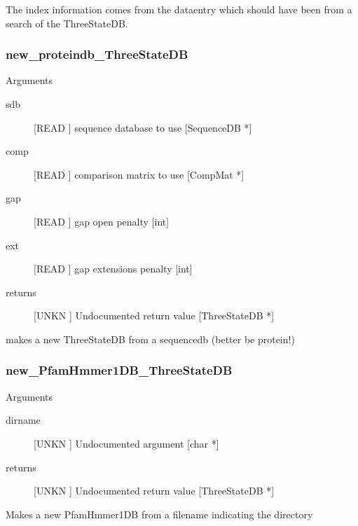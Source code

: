 The index information comes from the dataentry which should 
have been from a search of the ThreeStateDB.


\subsubsection{new_proteindb_ThreeStateDB}

Arguments
\begin{description}
\item[sdb] [READ ] sequence database to use [SequenceDB *]
\item[comp] [READ ] comparison matrix to use [CompMat *]
\item[gap] [READ ] gap open penalty [int]
\item[ext] [READ ] gap extensions penalty [int]
\item[returns] [UNKN ] Undocumented return value [ThreeStateDB *]
\end{description}
makes a new ThreeStateDB from a
sequencedb (better be protein!)




\subsubsection{new_PfamHmmer1DB_ThreeStateDB}

Arguments
\begin{description}
\item[dirname] [UNKN ] Undocumented argument [char *]
\item[returns] [UNKN ] Undocumented return value [ThreeStateDB *]
\end{description}
Makes a new PfamHmmer1DB from a filename
indicating the directory


